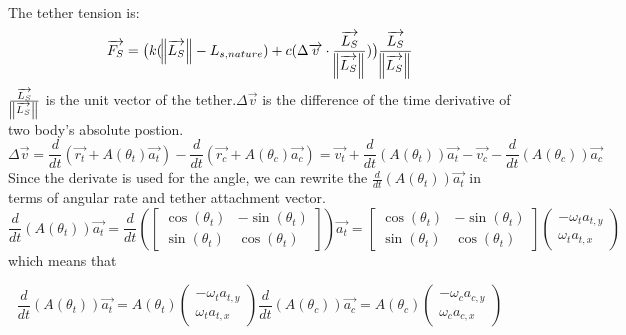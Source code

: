 The tether tension is: 
\begin{equation} \overrightarrow{F_S} = \bigl(k(\norm{\overrightarrow{L_S}} - L_{s,nature}) + c(\Delta\overrightarrow{v} \cdot 
	\frac{\overrightarrow{L_S}}{\norm{\overrightarrow{L_S}}})
	\bigr)
	\frac{\overrightarrow{L_S}}{
	\norm{
	\overrightarrow{L_S}
	}
	}
\end{equation}
$\frac{\overrightarrow{L_S}}{\norm{\overrightarrow{L_S}}}$ is the unit vector of the tether.$\Delta\overrightarrow{v}$ is the difference of the time derivative of two body's absolute postion. 
\begin{equation}\Delta\overrightarrow{v} = \frac{d}{dt}(\overrightarrow{r_t}+A(\theta_t)\overrightarrow{a_t}) - \frac{d}{dt}(\overrightarrow{r_c} + A(\theta_c)\overrightarrow{a_c}) = \overrightarrow{v_t} + \frac{d}{dt}(A(\theta_t))\overrightarrow{a_t}-\overrightarrow{v_c}-\frac{d}{dt}(A(\theta_c))\overrightarrow{a_c}\end{equation}
Since the derivate is used for the angle, we can rewrite the $\frac{d}{dt}(A(\theta_t))\overrightarrow{a_t}$ in terms of angular rate and tether attachment vector.
\begin{equation}\frac{d}{dt}(A(\theta_t))\overrightarrow{a_t} = \frac{d}{dt}
\left(
\begin{bmatrix}
\cos(\theta_t) & -\sin(\theta_t)\\
\sin(\theta_t) & \cos(\theta_t)
\end{bmatrix} \right)
\overrightarrow{a_t} =
\begin{bmatrix}
\cos(\theta_t) & -\sin(\theta_t)\\
\sin(\theta_t) & \cos(\theta_t)
\end{bmatrix}
\left(
\begin{array}{c}
-\omega_ta_{t,y}\\
\omega_ta_{t,x}
\end{array}\right)
\end{equation}
which means that 

$$\frac{d}{dt}(A(\theta_t))\overrightarrow{a_t} = A(\theta_t)\left(
\begin{array}{c}
-\omega_ta_{t,y}\\
\omega_ta_{t,x}
\end{array}\right) \frac{d}{dt}(A(\theta_c))\overrightarrow{a_c} = A(\theta_c)\left(
\begin{array}{c}
-\omega_ca_{c,y}\\
\omega_ca_{c,x}
\end{array}\right)$$


